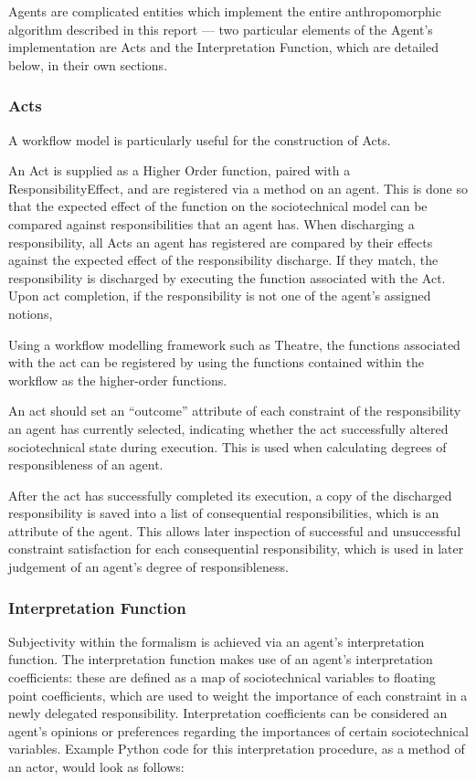 Agents are complicated entities which implement the entire anthropomorphic algorithm described in this report --- two particular elements of the Agent's implementation are Acts and the Interpretation Function, which are detailed below, in their own sections.

\subsubsection{Acts}
A workflow model is particularly useful for the construction of Acts.\par

An Act is supplied as a Higher Order function, paired with a ResponsibilityEffect, and are registered via a method on an agent. This is done so that the expected effect of the function on the sociotechnical model can be compared against responsibilities that an agent has. When discharging a responsibility, all Acts an agent has registered are compared by their effects against the expected effect of the responsibility discharge. If they match, the responsibility is discharged by executing the function associated with the Act. Upon act completion, if the responsibility is not one of the agent's assigned notions, \par

Using a workflow modelling framework such as Theatre\cite{theatre_code}, the functions associated with the act can be registered by using the functions contained within the workflow as the higher-order functions.\par

An act should set an ``outcome'' attribute of each constraint of the responsibility an agent has currently selected, indicating whether the act successfully altered sociotechnical state during execution. This is used when calculating degrees of responsibleness of an agent.\par

After the act has successfully completed its execution, a copy of the discharged responsibility is saved into a list of consequential responsibilities, which is an attribute of the agent. This allows later inspection of successful and unsuccessful constraint satisfaction for each consequential responsibility, which is used in later judgement of an agent's degree of responsibleness.\par

\subsubsection{Interpretation Function}\label{subsec:interpretation_function}
Subjectivity within the formalism is achieved via an agent's interpretation function. The interpretation function makes use of an agent's interpretation coefficients: these are defined as a map of sociotechnical variables to floating point coefficients, which are used to weight the importance of each constraint in a newly delegated responsibility. Interpretation coefficients can be considered an agent's opinions or preferences regarding the importances of certain sociotechnical variables. Example Python code for this interpretation procedure, as a method of an actor, would look as follows:

